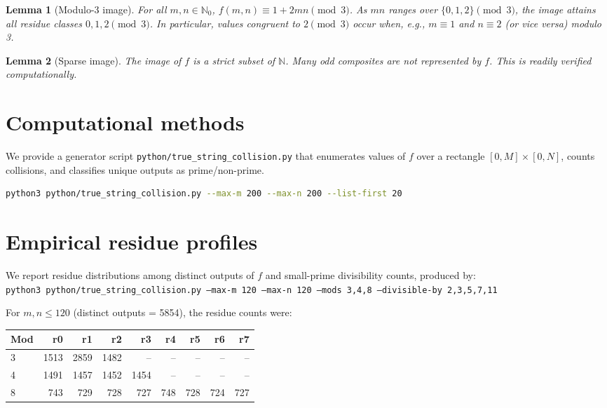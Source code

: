 \documentclass[12pt,a4paper]{article}
\newtheorem{lemma}{Lemma}[section]
\begin{document}
\begin{lemma}[Modulo-3 image]\label{lem:mod3}
For all \(m,n\in\mathbb{N}_0\), \(f(m,n) \equiv 1 + 2mn \pmod{3}\). As \(mn\) ranges over \(\{0,1,2\}\pmod{3}\), the image attains all residue classes \(0,1,2\pmod{3}\). In particular, values congruent to \(2\pmod{3}\) occur when, e.g., \(m\equiv 1\) and \(n\equiv 2\) (or vice versa) modulo 3.
\end{lemma}

\begin{lemma}[Sparse image]\label{lem:sparse}
The image of \(f\) is a strict subset of \(\mathbb{N}\). Many odd composites are not represented by \(f\). This is readily verified computationally.
\end{lemma}

\section{Computational methods}
We provide a generator script \texttt{python/true\_string\_collision.py} that enumerates values of \(f\) over a rectangle \([0,M]\times[0,N]\), counts collisions, and classifies unique outputs as prime/non-prime.

\begin{lstlisting}[language=bash,caption=Example usage]
python3 python/true_string_collision.py --max-m 200 --max-n 200 --list-first 20
\end{lstlisting}

\section{Empirical residue profiles}
We report residue distributions among distinct outputs of \(f\) and small-prime divisibility counts, produced by:\\
\texttt{python3 python/true\_string\_collision.py --max-m 120 --max-n 120 --mods 3,4,8 --divisible-by 2,3,5,7,11}

For \(m,n\le 120\) (distinct outputs = 5854), the residue counts were:
\begin{center}
\begin{tabular}{l|rrrrrrrr}
Mod & r0 & r1 & r2 & r3 & r4 & r5 & r6 & r7 \\
\hline
3 & 1513 & 2859 & 1482 & -- & -- & -- & -- & -- \\
4 & 1491 & 1457 & 1452 & 1454 & -- & -- & -- & -- \\
8 & 743 & 729 & 728 & 727 & 748 & 728 & 724 & 727 \\
\end{tabular}
\end{center}
\end{document}
